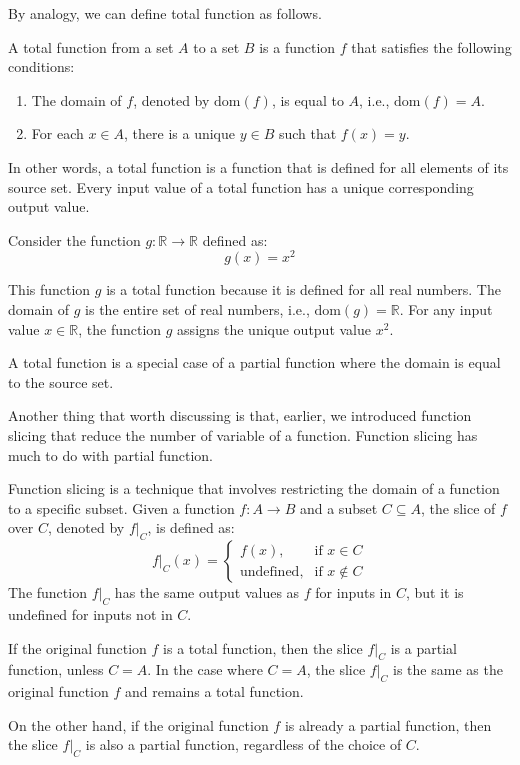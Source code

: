 By analogy, we can define total function as follows.
\begin{definition}
	A total function from a set $A$ to a set $B$ is a function $f$ that satisfies the following conditions:
	\begin{enumerate}
		\item The domain of $f$, denoted by $\text{dom}(f)$, is equal to $A$, i.e., $\text{dom}(f) = A$.
		\item For each $x \in A$, there is a unique $y \in B$ such that $f(x) = y$.
	\end{enumerate}
	
	In other words, a total function is a function that is defined for all elements of its source set. Every input value of a total function has a unique corresponding output value.
\end{definition}
\begin{example}
	Consider the function $g: \mathbb{R} \to \mathbb{R}$ defined as:
	$$
	g(x) = x^2
	$$
	
	This function $g$ is a total function because it is defined for all real numbers. The domain of $g$ is the entire set of real numbers, i.e., $\text{dom}(g) = \mathbb{R}$. For any input value $x \in \mathbb{R}$, the function $g$ assigns the unique output value $x^2$.
	
	A total function is a special case of a partial function where the domain is equal to the source set.
	
\end{example}

Another thing that worth discussing is that, earlier, we introduced function slicing that reduce the number of variable of a function. Function slicing has 
much to do with partial function.
\begin{proposition}
	Function slicing is a technique that involves restricting the domain of a function to a specific subset. Given a function $f: A \to B$ and a subset $C \subseteq A$, the slice of $f$ over $C$, denoted by $f|_C$, is defined as:
	$$
	f|_C(x) = \begin{cases}
		f(x), & \text{if } x \in C \\
		\text{undefined}, & \text{if } x \notin C
	\end{cases}
	$$
	The function $f|_C$ has the same output values as $f$ for inputs in $C$, but it is undefined for inputs not in $C$.
	
	If the original function $f$ is a total function, then the slice $f|_C$ is a partial function, unless $C = A$. In the case where $C = A$, the slice $f|_C$ is the same as the original function $f$ and remains a total function.
	
	On the other hand, if the original function $f$ is already a partial function, then the slice $f|_C$ is also a partial function, regardless of the choice of $C$.
\end{proposition}







